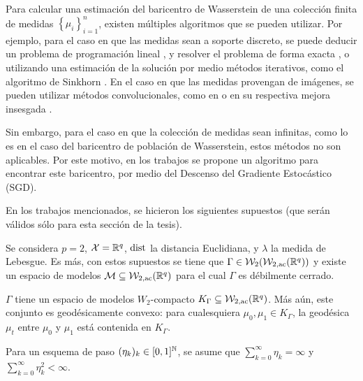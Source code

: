 
Para calcular una estimación del baricentro de Wasserstein de una colección finita de medidas $\left\{ \mu_i \right\}_{i=1}^{n}$, existen múltiples algoritmos que se pueden utilizar. Por ejemplo, para el caso en que las medidas sean a soporte discreto, se puede deducir un problema de programación lineal \cite[ver Cap. 3]{peyre2019computational}, y resolver el problema de forma exacta \cite{bonneel2011displacement}, o utilizando una estimación de la solución por medio métodos iterativos, como el algoritmo de Sinkhorn \cite{cuturi2013sinkhorn}. En el caso en que las medidas provengan de imágenes, se pueden utilizar métodos convolucionales, como en \cite{solomon2015convolutional} o en su respectiva mejora insesgada \cite{janati2020debiased}.

Sin embargo, para el caso en que la colección de medidas sean infinitas, como lo es en el caso del baricentro de población de Wasserstein, estos métodos no son aplicables. Por este motivo, en los trabajos \cite{rios2020contributions,backhoff2022stochastic,backhoff2022bayesian} se propone un algoritmo para encontrar este baricentro, por medio del Descenso del Gradiente Estocástico (SGD).

En los trabajos mencionados, se hicieron los siguientes supuestos (que serán válidos sólo para esta sección de la tesis).

\begin{assumption}\label{assump:caso-particular-lebesgue}
	Se considera $p=2$, $\cX = \R^q$, $\dist$ la distancia Euclidiana, y $\lambda$ la medida de Lebesgue. Es más, con estos supuestos se tiene que $\Gamma \in \WassersteinSpace[2]{\WassersteinSpace[2,\mathrm{ac}]{\R^q} } $ y existe un espacio de modelos $\Models \subseteq \WassersteinSpace[2, \mathrm{ac}]{\R^q} $ para el cual $\Gamma$ es débilmente cerrado.
\end{assumption}

\begin{assumption}\label{assump:caso-particular-geodesicamente-convexo}
	$\Gamma$ tiene un espacio de modelos $W_2$-compacto $K_\Gamma \subseteq \WassersteinSpace[2,\mathrm{ac}]{\R^q} $. Más aún, este conjunto es geodésicamente convexo: para cualesquiera $\mu_0, \mu_1 \in K_\Gamma$, la geodésica $\mu_t$ entre $\mu_0$ y $\mu_1$ está contenida en $K_\Gamma$.
\end{assumption}

\begin{assumption}\label{assump:caso-particular-esquema-paso-L1-L2}
	Para un esquema de paso $(\eta_k)_k \in [0, 1]^\N$, se asume que $\sum_{k=0}^{\infty} \eta_k = \infty$ y $\sum_{k=0}^{\infty} \eta_k^2 < \infty$.
\end{assumption}

